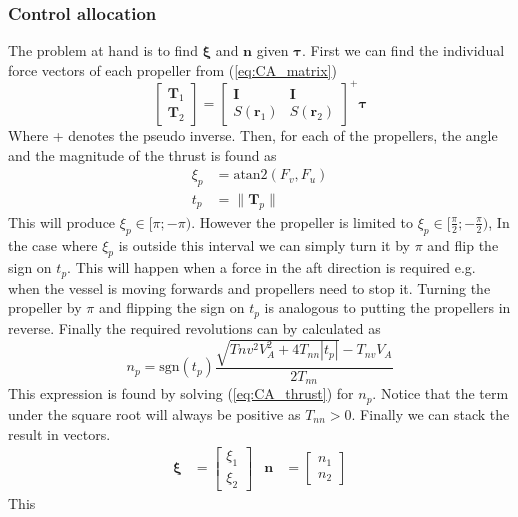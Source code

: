 \documentclass[12pt,a4]{article}
\begin{document}
\subsubsection{Control allocation}
The problem at hand is to find $\bm{\xi}$ and $\bm{n}$ given $\bm{\tau}$. First we can find the individual force vectors of each propeller from (\ref{eq:CA_matrix})
\begin{equation}
	\begin{bmatrix} \bm{T}_1 \\ \bm{T}_2 \end{bmatrix} =
	\begin{bmatrix} \bm{I} & \bm{I} \\ S(\bm{r}_1) & S(\bm{r}_2) \end{bmatrix}^+ \bm{\tau}
\end{equation}
Where + denotes the pseudo inverse. Then, for each of the propellers, the angle and the magnitude of the thrust is found as
\begin{align}
	\xi_p & = \text{atan2}(F_v,F_u) \\
	t_p   & = \|\bm{T}_p\|
\end{align}
This will produce $\xi_p \in [\pi ; -\pi)$. However the propeller is limited to $\xi_p \in [\frac{\pi}{2} ; -\frac{\pi}{2})$,
In the case where $\xi_p$ is outside this interval we can simply turn it by $\pi$ and flip the sign on $t_p$. This will happen when a force in the aft direction is required e.g. when the vessel is moving forwards and propellers need to stop it. Turning the propeller by $\pi$ and flipping the sign on $t_p$ is analogous to putting the propellers in reverse.
Finally the required revolutions can by calculated as
\begin{equation}
	n_p = \text{sgn}(t_p) \dfrac{\sqrt{Tnv^2 V_A^2 + 4 T_{nn} |t_p|}-T_{nv} V_A}{2 T_{nn}}
\end{equation}
This expression is found by solving (\ref{eq:CA_thrust}) for $n_p$. Notice that the term under the square root will always be positive as $T_{nn}>0$.
Finally we can stack the result in vectors.
\begin{align}
	\bm{\xi} & = \begin{bmatrix} \xi_1 \\ \xi_2 \end{bmatrix} & \bm{n} & = \begin{bmatrix} n_1 \\ n_2 \end{bmatrix}
\end{align}
This
\end{document}
